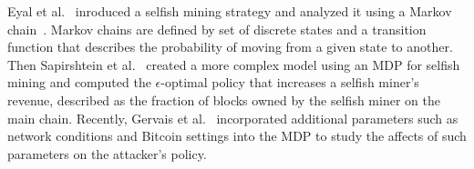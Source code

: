 Eyal et al.~\cite{eyal:2014} inroduced a selfish mining strategy and analyzed it using a Markov chain~\cite{Markov:1971}. Markov chains are defined by set of discrete states and a transition function that describes the probability of moving from a given state to another. Then Sapirshtein et al.~\cite{sapirshtein:2015} created a more complex model using an MDP for selfish mining and computed the $\epsilon$-optimal policy that increases a selfish miner's revenue, described as the fraction of blocks owned by the selfish miner on the main chain. Recently, Gervais et al.~\cite{Gervais:2016} incorporated additional parameters such as network conditions and Bitcoin settings into the MDP to study the affects of such parameters on the attacker's policy. %

